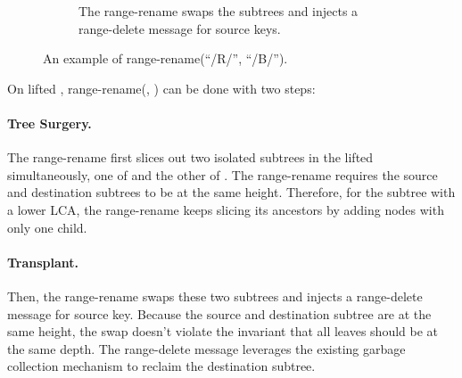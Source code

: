 \begin{figure}
\begin{subfigure}{\textwidth}
        \caption{\label{subfig:rr-3} The range-rename swaps the subtrees and
            injects a range-delete message for source keys.}
    \end{subfigure}
    \caption[A range-rename example]{\label{fig:rr}
        An example of range-rename(``/R/'', ``/B/'').}
\end{figure}

On lifted \bets, range-rename(\spre, \dpre) can be done with two steps:

\paragraph{Tree Surgery.}
The range-rename first slices out two isolated subtrees in the lifted \bet
simultaneously, one of \spre and the other of \dpre.
The range-rename requires the source and destination subtrees to be at the same
height.
Therefore, for the subtree with a lower LCA, the range-rename keeps slicing its
ancestors by adding nodes with only one child.

\paragraph{Transplant.}
Then, the range-rename swaps these two subtrees and injects a range-delete
message for source key.
Because the source and destination subtree are at the same height, the swap
doesn't violate the \bet invariant that all leaves should be at the same depth.
The range-delete message leverages the existing garbage collection mechanism
to reclaim the destination subtree.

